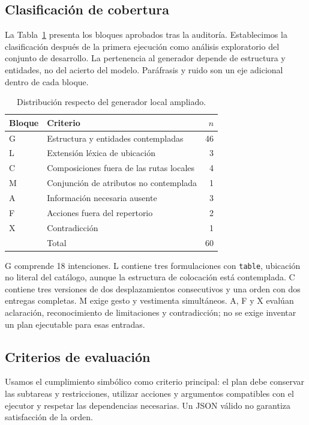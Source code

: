 \documentclass[a4paper,twoside]{article}
\begin{document}
\subsection{Clasificación de cobertura}

La Tabla~\ref{tab:bloques_piloto} presenta los bloques aprobados tras la auditoría. Establecimos la clasificación después de la primera ejecución como análisis exploratorio del conjunto de desarrollo. La pertenencia al generador depende de estructura y entidades, no del acierto del modelo. Paráfrasis y ruido son un eje adicional dentro de cada bloque.

\begin{table}[htbp]
\centering\small
\caption{Distribución respecto del generador local ampliado.}
\label{tab:bloques_piloto}
\begin{tabularx}{\columnwidth}{@{}l>{\raggedright\arraybackslash}Xr@{}}
\toprule
Bloque & Criterio & $n$ \\
\midrule
G & Estructura y entidades contempladas & 46 \\
L & Extensión léxica de ubicación & 3 \\
C & Composiciones fuera de las rutas locales & 4 \\
M & Conjunción de atributos no contemplada & 1 \\
A & Información necesaria ausente & 3 \\
F & Acciones fuera del repertorio & 2 \\
X & Contradicción & 1 \\
\midrule
 & Total & 60 \\
\bottomrule
\end{tabularx}
\end{table}

G comprende 18 intenciones. L contiene tres formulaciones con \texttt{table}, ubicación no literal del catálogo, aunque la estructura de colocación está contemplada. C contiene tres versiones de dos desplazamientos consecutivos y una orden con dos entregas completas. M exige gesto y vestimenta simultáneos. A, F y X evalúan aclaración, reconocimiento de limitaciones y contradicción; no se exige inventar un plan ejecutable para esas entradas.

\subsection{Criterios de evaluación}
Usamos el cumplimiento simbólico como criterio principal: el plan debe conservar las subtareas y restricciones, utilizar acciones y argumentos compatibles con el ejecutor y respetar las dependencias necesarias. Un JSON válido no garantiza satisfacción de la orden.
\end{document}
